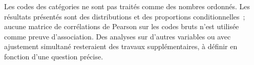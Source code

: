 Les codes des catégories ne sont pas traités comme des nombres ordonnés. Les résultats
présentés sont des distributions et des proportions conditionnelles~; aucune matrice
de corrélations de Pearson sur les codes bruts n'est utilisée comme preuve d'association.
Des analyses sur d'autres variables ou avec ajustement simultané resteraient des
travaux supplémentaires, à définir en fonction d'une question précise.

